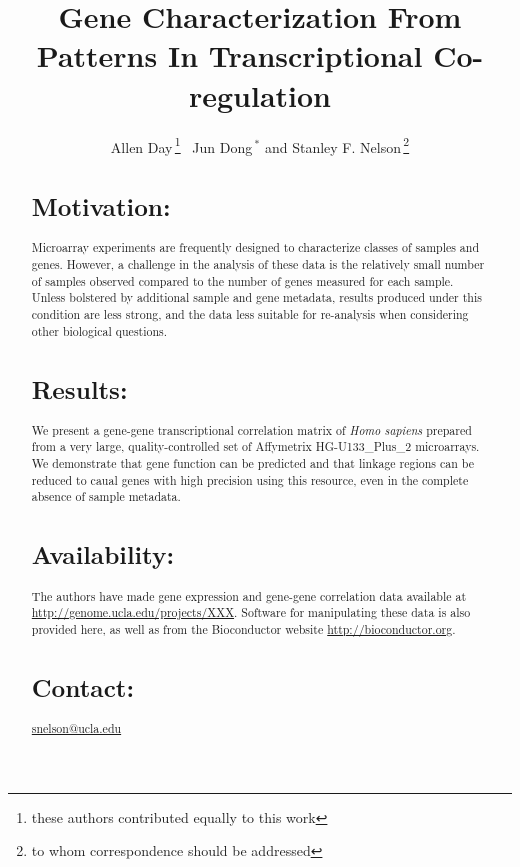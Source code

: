 \documentclass{bioinfo}
\begin{document}

\title[Transcriptional Co-regulation]{Gene Characterization From Patterns In Transcriptional Co-regulation}
\author[Day \textit{et~al}]{Allen Day\,\footnote{these authors contributed equally to this work}~ Jun Dong\,$^{*}$ and Stanley F. Nelson\,\footnote{to whom correspondence should be addressed}}
\address{Department of Human Genetics, David Geffen School of Medicine, University of California, Los Angeles.}
\maketitle

\begin{abstract}

\section{Motivation:}
Microarray experiments are frequently designed to characterize classes of
samples and genes.  However, a challenge in the analysis of these data is the
relatively small number of samples observed compared to the number of genes
measured for each sample.  Unless bolstered by additional sample and gene
metadata, results produced under this condition are less strong, and the data
less suitable for re-analysis when considering other biological questions.

\section{Results:}
We present a gene-gene transcriptional correlation matrix of \emph{Homo
sapiens} prepared from a very large, quality-controlled set of Affymetrix
HG-U133\_Plus\_2 microarrays.  We demonstrate that gene function can be
predicted and that linkage regions can be reduced to caual genes with high
precision using this resource, even in the complete absence of sample metadata.

\section{Availability:}
The authors have made gene expression and gene-gene correlation data available
at \url{http://genome.ucla.edu/projects/XXX}.  Software for manipulating these
data is also provided here, as well as from the Bioconductor website
\url{http://bioconductor.org}.

\section{Contact:} \href{snelson@ucla.edu}{snelson@ucla.edu}
\end{abstract}
\end{document}
